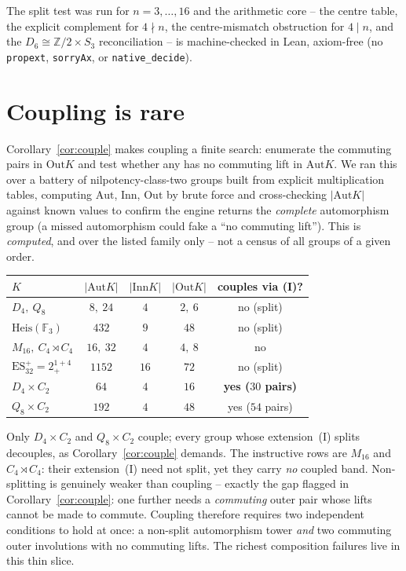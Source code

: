 \documentclass[11pt]{article}
\theoremstyle{definition}
\newcommand{\Z}{\mathbb{Z}}
\newcommand{\Aut}{\mathrm{Aut}}
\newcommand{\Inn}{\mathrm{Inn}}
\newcommand{\Out}{\mathrm{Out}}
\begin{document}
The split test was run for $n=3,\dots,16$ and the arithmetic core -- the centre table, the
explicit complement for $4\nmid n$, the centre-mismatch obstruction for $4\mid n$, and the
$D_6\cong\Z/2\times S_3$ reconciliation -- is machine-checked in Lean, axiom-free (no
\texttt{propext}, \texttt{sorryAx}, or \texttt{native\_decide}).

\section{Coupling is rare}\label{sec:rarity}

Corollary~\ref{cor:couple} makes coupling a finite search: enumerate the commuting pairs in
$\Out K$ and test whether any has no commuting lift in $\Aut K$. We ran this over a battery of
nilpotency-class-two groups built from explicit multiplication tables, computing $\Aut$, $\Inn$,
$\Out$ by brute force and cross-checking $|\Aut K|$ against known values to confirm the engine
returns the \emph{complete} automorphism group (a missed automorphism could fake a ``no commuting
lift''). This is \emph{computed}, and over the listed family only -- not a census of all groups of
a given order.

\begin{center}
\small
\begin{tabular}{@{}lcccc@{}}
\toprule
$K$ & $|\Aut K|$ & $|\Inn K|$ & $|\Out K|$ & couples via (I)? \\
\midrule
$D_4,\ Q_8$ & $8,\ 24$ & $4$ & $2,\ 6$ & no (split) \\
$\mathrm{Heis}(\mathbb F_3)$ & $432$ & $9$ & $48$ & no (split) \\
$M_{16},\ C_4\rtimes C_4$ & $16,\ 32$ & $4$ & $4,\ 8$ & no \\
$\mathrm{ES}^+_{32}=2^{1+4}_+$ & $1152$ & $16$ & $72$ & no (split) \\
$\boxed{D_4\times C_2}$ & $64$ & $4$ & $16$ & \textbf{yes ($30$ pairs)} \\
$Q_8\times C_2$ & $192$ & $4$ & $48$ & yes ($54$ pairs) \\
\bottomrule
\end{tabular}
\end{center}

Only $D_4\times C_2$ and $Q_8\times C_2$ couple; every group whose extension~(I) splits
decouples, as Corollary~\ref{cor:couple} demands. The instructive rows are $M_{16}$ and
$C_4\rtimes C_4$: their extension~(I) need not split, yet they carry \emph{no} coupled band.
Non-splitting is genuinely weaker than coupling -- exactly the gap flagged in
Corollary~\ref{cor:couple}: one further needs a \emph{commuting} outer pair whose lifts cannot be
made to commute. Coupling therefore requires two independent conditions to hold at once: a
non-split automorphism tower \emph{and} two commuting outer involutions with no commuting lifts.
The richest composition failures live in this thin slice.
\end{document}
